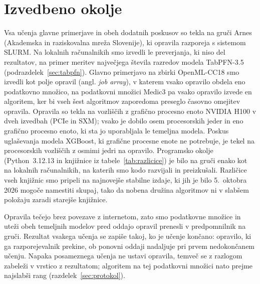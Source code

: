 \documentclass[a4paper,12pt,openright]{book}
\begin{document}
\section{Izvedbeno okolje}
\label{sec:okolje}

Vsa učenja glavne primerjave in obeh dodatnih poskusov so tekla na gruči
Arnes (Akademska in raziskovalna mreža Slovenije), ki opravila razporeja s
sistemom SLURM. Na lokalnih računalnikih smo izvedli le preverjanja, ki niso
del rezultatov, na primer meritev največjega števila razredov modela TabPFN-3.5
(podrazdelek~\ref{sec:tabpfn}).
Glavno primerjavo na zbirki OpenML-CC18 smo izvedli kot polje opravil (angl.
\emph{job array}), v katerem vsako opravilo obdela eno podatkovno množico, na
podatkovni množici Medic3 pa vsako opravilo izvede en algoritem, ker bi vseh
šest algoritmov zaporedoma preseglo časovno omejitev opravila. Opravila so
tekla na vozliščih z grafično procesno enoto NVIDIA H100 v dveh izvedbah (PCIe
in SXM); vsako je dobilo osem procesorskih jeder in eno grafično procesno
enoto, ki sta jo uporabljala le temeljna modela. Poskus uglaševanja modela
XGBoost, ki grafične procesne enote ne potrebuje, je tekel na procesorskih
vozliščih z osmimi jedri na opravilo. Programsko okolje (Python~3.12.13 in
knjižnice iz tabele~\ref{tab:razlicice}) je bilo na gruči enako kot na
lokalnih računalnikih, na katerih smo kodo razvijali in preizkušali.
Različice vseh knjižnic smo pripeli na najnovejše stabilne izdaje, ki jih je
bilo 5.~oktobra 2026 mogoče namestiti skupaj, tako da nobena družina algoritmov
ni v slabšem položaju zaradi starejše knjižnice.

Opravila tečejo brez povezave z internetom, zato smo podatkovne množice in
uteži obeh temeljnih modelov pred oddajo opravil prenesli v predpomnilnik na
gruči. Rezultat vsakega učenja se zapiše takoj, ko je učenje
končano: opravilo, ki ga razporejevalnik prekine, ob ponovni oddaji nadaljuje
pri prvem nedokončanem učenju. Napaka posameznega učenja ne ustavi opravila,
temveč se z razlogom zabeleži v vrstico z rezultatom; algoritem na tej
podatkovni množici nato prejme najslabši rang (razdelek~\ref{sec:protokol}).
\end{document}
